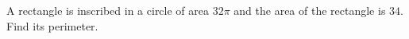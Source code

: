 A rectangle is inscribed in a circle of area $32\pi$ and the area of the rectangle is $34$. Find its perimeter.